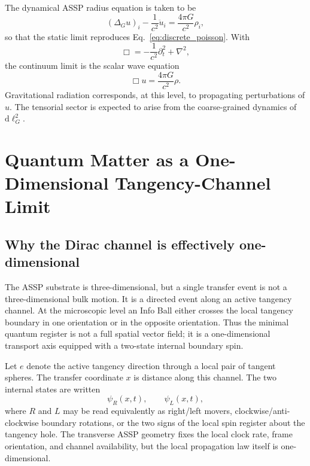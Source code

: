 \documentclass[11pt,a4paper]{article}
\newcommand{\dd}{\mathrm{d}}
\begin{document}
The dynamical ASSP radius equation is taken to be
\begin{equation}
  (\Delta_Gu)_i-\frac{1}{c^2}\ddot u_i=\frac{4\pi G}{c^2}\rho_i,
  \label{eq:wave_gravity}
\end{equation}
so that the static limit reproduces Eq.~\eqref{eq:discrete_poisson}.  With
\begin{equation}
  \Box=-\frac{1}{c^2}\partial_t^2+\nabla^2,
\end{equation}
the continuum limit is the scalar wave equation
\begin{equation}
  \Box u=\frac{4\pi G}{c^2}\rho.
  \label{eq:scalar_wave}
\end{equation}
Gravitational radiation corresponds, at this level, to propagating
perturbations of $u$. The tensorial sector is expected to arise from the
coarse-grained dynamics of $\dd\ell_G^2$.

\section{Quantum Matter as a One-Dimensional Tangency-Channel Limit}

\subsection{Why the Dirac channel is effectively one-dimensional}

The ASSP substrate is three-dimensional, but a single transfer event is not a
three-dimensional bulk motion.  It is a directed event along an active
tangency channel.  At the microscopic level an Info Ball either crosses the
local tangency boundary in one orientation or in the opposite orientation.
Thus the minimal quantum register is not a full spatial vector field; it is a
one-dimensional transport axis equipped with a two-state internal boundary
spin.

Let \(e\) denote the active tangency direction through a local pair of tangent
spheres.  The transfer coordinate \(x\) is distance along this channel.  The
two internal states are written
\[
  \psi_R(x,t),\qquad \psi_L(x,t),
\]
where \(R\) and \(L\) may be read equivalently as right/left movers,
clockwise/anti-clockwise boundary rotations, or the two signs of the local
spin register about the tangency hole.  The transverse ASSP geometry fixes the
local clock rate, frame orientation, and channel availability, but the local
propagation law itself is one-dimensional.
\end{document}

